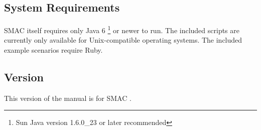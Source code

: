 \subsection{System Requirements}

SMAC itself requires only Java 6 \footnote{Sun Java version 1.6.0\_23 or later recommended} or newer to run. The included scripts are currently only available for Unix-compatible operating systems. The included example scenarios require Ruby. 

\subsection{Version}
This version of the manual is for SMAC $\!\!$.
\\





